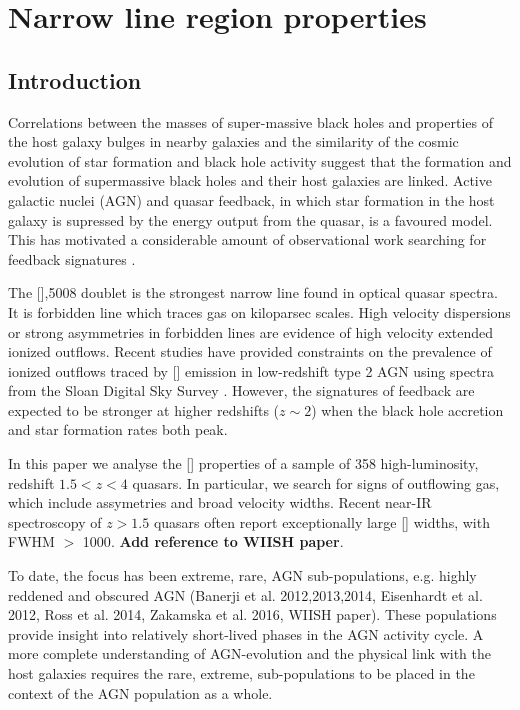 \chapter{Narrow line region properties}\label{ch:nlr} 

\section{Introduction}

Correlations between the masses of super-massive black holes and properties of the host galaxy bulges in nearby galaxies \citep{gebhardt00,ferrarese00} and the similarity of the cosmic evolution of star formation and black hole activity \citep{boyle98,madau14} suggest that the formation and evolution of supermassive black holes and their host galaxies are linked. 
Active galactic nuclei (AGN) and quasar feedback, in which star formation in the host galaxy is supressed by the energy output from the quasar, is a favoured model.
This has motivated a considerable amount of observational work searching for feedback signatures \citep[for recent reviews, see][]{alexander12,fabian12,heckman14}. 

The [],5008 doublet is the strongest narrow line found in optical quasar spectra.
It is forbidden line which traces gas on kiloparsec scales.  
High velocity dispersions or strong asymmetries in forbidden lines are evidence of high velocity extended ionized outflows.
Recent studies have provided constraints on the prevalence of ionized outflows traced by [] emission in low-redshift type 2 AGN \citep[e.g.][]{mullaney13,zakamska14} using spectra from the Sloan Digital Sky Survey \citep[SDSS;][]{york00}. 
However, the signatures of feedback are expected to be stronger at higher redshifts ($z\sim2$) when the black hole accretion and star formation rates both peak. 

In this paper we analyse the [] properties of a sample of 358 high-luminosity, redshift $1.5 < z < 4$ quasars. 
In particular, we search for signs of outflowing gas, which include assymetries and broad velocity widths. 
Recent near-IR spectroscopy of $z>1.5$ quasars often report exceptionally large [] widths, with FWHM $>$ 1000\kms \citep[e.g.][]{netzer04,nesvadba08,kim13,brusa15,carniani15,perna15}. 
{\bf Add reference to WIISH paper}. 

To date, the focus has been extreme, rare, AGN sub-populations, e.g. highly reddened and obscured AGN (Banerji et al. 2012,2013,2014, Eisenhardt et al. 2012, Ross et al. 2014, Zakamska et al. 2016, WIISH paper).  
These populations provide insight into relatively short-lived phases in the AGN activity cycle. 
A more complete understanding of AGN-evolution and the physical link with the host galaxies requires the rare, extreme, sub-populations to be placed in the context of the AGN population as a whole. 

